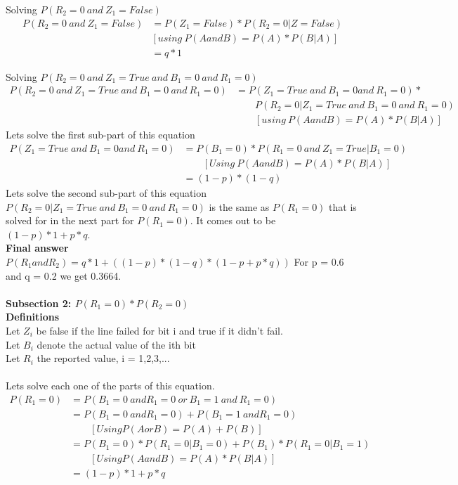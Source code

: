 \documentclass[12pt]{article}
\begin{document}
Solving $ P(R_2 = 0\ and\ Z_1 = False)$
\begin{align}
P(R_2 = 0\ and\ Z_1 = False)  & = P(Z_1 = False) * P(R_2 = 0 | Z = False) \nonumber \\
& [using\ P(A and B) = P(A) * P(B|A)]\ \nonumber \\
& = q * 1 \nonumber
\end{align}

Solving $P(R_2 = 0\ and\ Z_1 = True\ and\  B_1 = 0\ and\ R_1 = 0) $ \\
\begin{align}
P(R_2 = 0\ and\ Z_1 = True\ and\  B_1 = 0\ and\ R_1 = 0)  & = P(Z_1 = True\ and\  B_1 = 0 and\ R_1 = 0) * \nonumber \\
& \qquad P( R_2 = 0| Z_1 = True\ and\  B_1 = 0\ and\ R_1 = 0) \nonumber \\
& \qquad[using\ P(A and B) = P(A) * P(B|A)] \nonumber
\end{align}
Lets solve the first sub-part of this equation\\
\begin{align}
P(Z_1 = True\ and\  B_1 = 0 and\ R_1 = 0) & = P(B_1 = 0) * P(R_1 = 0\ and\ Z_1 = True | B_1 = 0 ) \nonumber \\
& \qquad [Using\ P(A and B) = P(A) * P(B|A) ] \nonumber \\
& = (1-p) * (1-q) \nonumber
\end{align}
Lets solve the second sub-part of this equation\\
$P( R_2 = 0| Z_1 = True\ and\  B_1 = 0\ and\ R_1 = 0)$ is the same as $P(R_1 = 0)$ that is solved for in the next part for $P(R_1 = 0)$. It comes out to be $(1-p)*1 + p*q$.\\
\textbf{Final answer}\\
$P(R_1 and R_2) = q*1+  ((1-p)*(1-q)*(1-p+p*q)) $
For p = 0.6 and q = 0.2 we get 0.3664.\\\\
\textbf{Subsection 2: $P(R_1 = 0) * P( R_2 = 0)$ }\\
\textbf{Definitions}\\
Let $Z_i$ be false if the line failed for bit i and true if it didn't fail.\\
Let $B_i$ denote the actual value of the ith bit \\
Let  $R_i$ the reported value, i = 1,2,3,...\\\\
Lets solve each one of the parts of this equation.
\begin{align}
P(R_1 = 0) & = P(B_1 = 0\ and R_1 = 0\ or\ B_1 = 1\ and\ R_1 = 0)\ \nonumber\\
& = P(B_1 = 0\ and R_1 = 0) + P(B_1 = 1\ and R_1 = 0) \nonumber \\
& \qquad [Using P(A or B) = P(A) + P(B)] \nonumber \\
& = P(B_1 = 0)*P(R_1 = 0 | B_1 = 0) + P(B_1) * P(R_1 = 0 |B_1 = 1 ) \nonumber \\
& \qquad [Using P(A and B) = P(A) * P(B|A)] \nonumber \\
& = (1-p)*1 + p*q \nonumber
\end{align}
\end{document}
